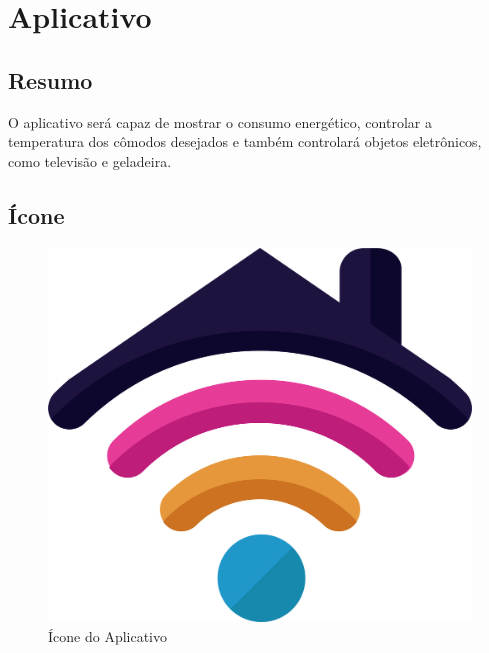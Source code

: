 	   \section{Aplicativo}
 	        \subsection{Resumo}
 	            \par O aplicativo será capaz de mostrar o consumo energético, controlar a temperatura dos cômodos desejados e também controlará objetos eletrônicos, como televisão e geladeira.
 	        \subsection{Ícone}
                \graphicspath{ {figuras/} }
                \begin{figure}[h]
                    \centering
                    \includegraphics[scale=0.4]{icon}
                    \caption{Ícone do Aplicativo}
                    \label{fig:icon}
                \end{figure}

